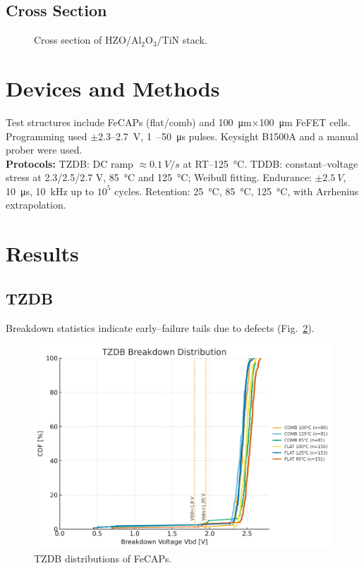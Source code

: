 \documentclass[conference]{IEEEtran}
\begin{document}
\subsection{Cross Section}
\begin{figure}[t]
\centering
{}
\caption{Cross section of HZO/Al\(_2\)O\(_3\)/TiN stack.}
\label{fig:cross_section}
\end{figure}

\section{Devices and Methods}
Test structures include FeCAPs (flat/comb) and \SI{100}{\micro m}\(\times\)\SI{100}{\micro m} FeFET cells.
Programming used \(\pm\)2.3–\SI{2.7}{V}, \SI{1}{–}\SI{50}{\micro s} pulses.
Keysight B1500A and a manual prober were used.\\
\textbf{Protocols:}
TZDB: DC ramp \(\approx \SI{0.1}{V/s}\) at RT–\SI{125}{\celsius}.
TDDB: constant–voltage stress at 2.3/2.5/2.7 V, \SI{85}{\celsius} and \SI{125}{\celsius}; Weibull fitting.
Endurance: \(\pm\SI{2.5}{V}\), \SI{10}{\micro s}, \SI{10}{kHz} up to \(10^{5}\) cycles.
Retention: \SI{25}{\celsius}, \SI{85}{\celsius}, \SI{125}{\celsius}, with Arrhenius extrapolation.

\section{Results}

\subsection{TZDB}
Breakdown statistics indicate early–failure tails due to defects (Fig.~\ref{fig:tzdb}).
\begin{figure}[t]
\centering
\includegraphics[width=\linewidth]{figures/fig3_tzdb.png}
\caption{TZDB distributions of FeCAPs.}
\label{fig:tzdb}
\end{figure}
\end{document}
